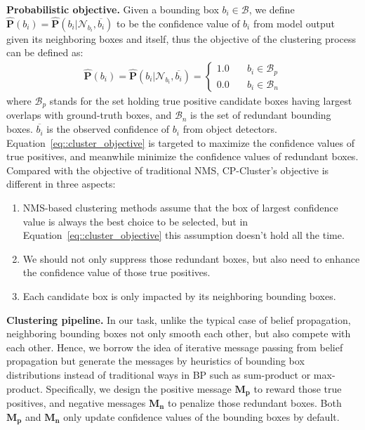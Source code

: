 \documentclass[10pt,twocolumn,letterpaper]{article}
\begin{document}
\textbf{Probabilistic objective.} Given a bounding box $b_i\in{\mathcal{B}}$, we define $\mathbf{\hat{P}}(b_i)=\mathbf{\hat{P}}(b_i|\mathcal{N}_{b_{i}},\overline{b_{i}})$ to be the confidence value of $b_i$ from model output given its neighboring boxes and itself, thus the objective of the clustering process can be defined as:
\begin{align}
  \mathbf{\hat{P}}(b_i) = \mathbf{\hat{P}}(b_i|\mathcal{N}_{b_{i}},\overline{b_{i}}) = \left\{
          \begin{array}{ll}
              1.0 & \quad b_i \in \mathcal{B}_p \\
              0.0 & \quad b_i \in \mathcal{B}_n
          \end{array}
      \right. \label{eq::cluster_objective}
\end{align}
where $\mathcal{B}_p$ stands for the set holding true positive candidate boxes having largest overlaps with ground-truth boxes, and $\mathcal{B}_n$ is the set of redundant bounding boxes. $\overline{b_{i}}$ is the observed confidence of $b_i$ from object detectors.
Equation~\eqref{eq::cluster_objective} is targeted to maximize the confidence values of true positives, and meanwhile minimize the confidence values of redundant boxes.
Compared with the objective of traditional NMS, CP-Cluster's objective is different in three aspects:
\begin{enumerate}
  \item NMS-based clustering methods assume that the box of largest confidence value is always the best choice to be selected, but in Equation~\eqref{eq::cluster_objective} this assumption doesn't hold all the time.
  \item We should not only suppress those redundant boxes, but also need to enhance the confidence value of those true positives.
  \item Each candidate box is only impacted by its neighboring bounding boxes.
\end{enumerate}
\textbf{Clustering pipeline.} In our task, unlike the typical case of belief propagation, neighboring bounding boxes not only smooth each other, but also compete with each other.
Hence, we borrow the idea of iterative message passing from belief propagation but generate the messages by heuristics of bounding box distributions instead of traditional ways in BP such as sum-product or max-product.
Specifically, we design the positive message $\mathbf{M_p}$ to reward those true positives, and negative messages $\mathbf{M_n}$ to penalize those redundant boxes.
Both $\mathbf{M_p}$ and $\mathbf{M_n}$ only update confidence values of the bounding boxes by default.
\end{document}
